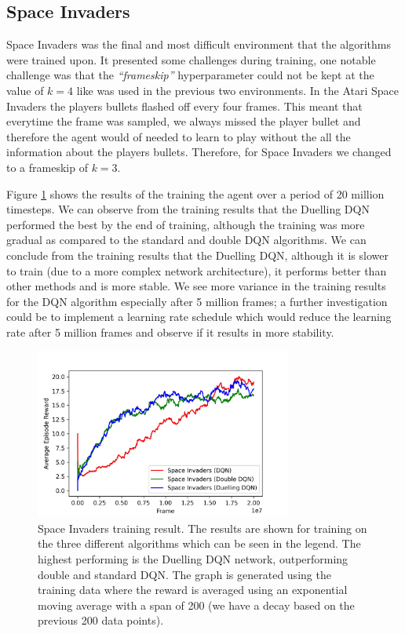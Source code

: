 \subsection{Space Invaders}
Space Invaders was the final and most difficult environment that the algorithms were trained upon. It presented some challenges during training, one notable challenge was that the \textit{``frameskip''} hyperparameter could not be kept at the value of $k = 4$ like was used in the previous two environments. In the Atari Space Invaders the players bullets flashed off every four frames. This meant that everytime the frame was sampled, we always missed the player bullet and therefore the agent would of needed to learn to play without the all the information about the players bullets. Therefore, for Space Invaders we changed to a frameskip of $k = 3$.

Figure \ref{fig:si-train-results} shows the results of the training the agent over a period of 20 million timesteps. We can observe from the training results that the Duelling DQN performed the best by the end of training, although the training was more gradual as compared to the standard and double DQN algorithms. We can conclude from the training results that the Duelling DQN, although it is slower to train (due to a more complex network architecture), it performs better than other methods and is more stable. We see more variance in the training results for the DQN algorithm especially after 5 million frames; a further investigation could be to implement a learning rate schedule which would reduce the learning rate after 5 million frames and observe if it results in more stability.

\begin{figure}[htbp]
	\centering
	\includegraphics[width=0.75\textwidth]{chapters/chapter5/images/si_plot.jpg}
	\caption[Space Invaders training result plot]{Space Invaders training result. The results are shown for training on the three different algorithms which can be seen in the legend. The highest performing is the Duelling DQN network, outperforming double and standard DQN. The graph is generated using the training data where the reward is averaged using an exponential moving average with a span of 200 (we have a decay based on the previous 200 data points).
		\label{fig:si-train-results}
	}
\end{figure}

